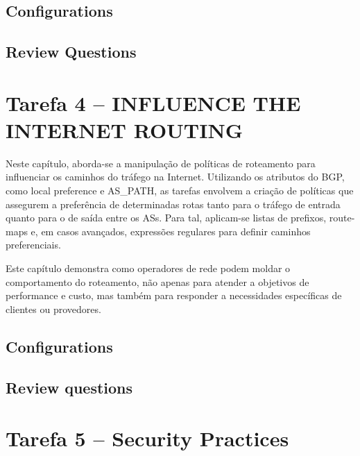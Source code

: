 \documentclass[11pt,english, openright, oneside]{book}
\begin{document}
\subsection{Configurations}
\vspace{0.2cm}

\subsection{Review Questions}
\vspace{0.2cm}



\pagebreak
\section{Tarefa 4 -- INFLUENCE THE INTERNET ROUTING}
\vspace{0.2cm}

Neste capítulo, aborda-se a manipulação de políticas de roteamento para influenciar os caminhos do tráfego na Internet. Utilizando os atributos do BGP, como local preference e AS\_PATH, as tarefas envolvem a criação de políticas que assegurem a preferência de determinadas rotas tanto para o tráfego de entrada quanto para o de saída entre os ASs. Para tal, aplicam-se listas de prefixos, route-maps e, em casos avançados, expressões regulares para definir caminhos preferenciais. 

Este capítulo demonstra como operadores de rede podem moldar o comportamento do roteamento, não apenas para atender a objetivos de performance e custo, mas também para responder a necessidades específicas de clientes ou provedores.

\subsection{Configurations}
\vspace{0.2cm}

\subsection{Review questions}
\vspace{0.2cm}


\pagebreak
\section{Tarefa 5 -- Security Practices}
\vspace{0.2cm}
\end{document}
